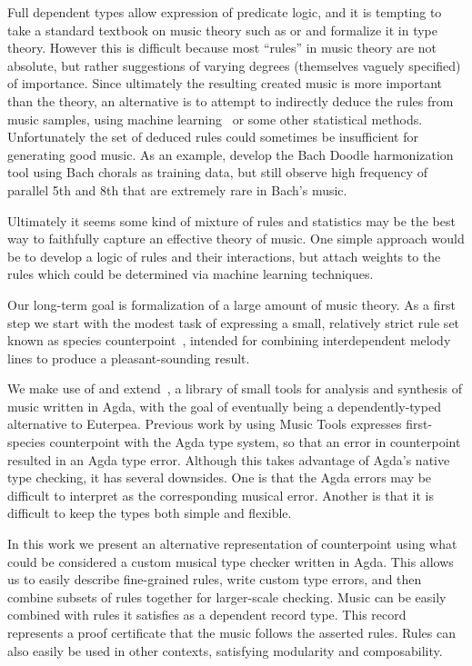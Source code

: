 Full dependent types allow expression of predicate logic, and it is
tempting to take a standard textbook on music theory such as
\citet{piston-harmony} or \citet{aldwell2018harmony} and 
formalize it in type theory. However this is difficult because most
``rules'' in music theory are not absolute, but rather suggestions of
varying degrees (themselves vaguely specified) of importance. Since
ultimately the resulting created music is more important than the
theory, an alternative is to attempt to indirectly deduce the rules
from music samples, using machine learning~\citep{huang-cp} or
some other statistical methods. Unfortunately the set of deduced
rules could sometimes be insufficient for generating good music.
As an example, \citet{roberts-cp} develop the Bach Doodle
harmonization tool using Bach chorals as training data, but still
observe high frequency of parallel 5th and 8th that are extremely
rare in Bach's music.

Ultimately it seems some kind of mixture of rules and statistics may
be the best way to faithfully capture an effective theory of
music. One simple approach would be to develop a logic of rules and
their interactions, but attach weights to the rules which could be
determined via machine learning techniques.

Our long-term goal is formalization of a large amount of music theory.
As a first step we start with the modest task of expressing a small,
relatively strict rule set known as species
counterpoint~\cite{fux-cp}, intended for combining interdependent
melody lines to produce a pleasant-sounding result.

We make use of and extend~\citet{MusicTools}, a library of small tools
for analysis and synthesis of music written in Agda, with the goal of
eventually being a dependently-typed alternative to Euterpea.
Previous work by \citet{cong-cp} using Music Tools expresses
first-species counterpoint with the Agda type system, so that an error
in counterpoint resulted in an Agda type error. Although this takes
advantage of Agda's native type checking, it has several
downsides. One is that the Agda errors may be difficult to interpret
as the corresponding musical error. Another is that it is difficult to
keep the types both simple and flexible.

In this work we present an alternative representation of counterpoint
using what could be considered a custom musical type checker written
in Agda. This allows us to easily describe fine-grained rules, write
custom type errors, and then combine subsets of rules together for
larger-scale checking. Music can be easily combined with rules it
satisfies as a dependent record type. This record represents a proof
certificate that the music follows the asserted rules.
Rules can also easily be used in
other contexts, satisfying modularity and composability.

